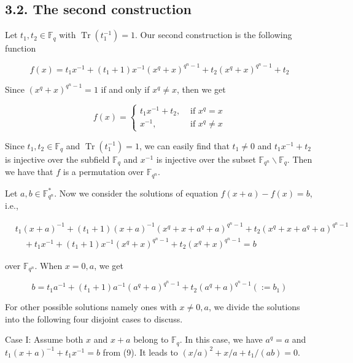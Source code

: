 \documentclass[10pt]{article}
\begin{document}
\subsection*{3.2. The second construction}
Let $t_{1}, t_{2} \in \mathbb{F}_{q}$ with $\operatorname{Tr}\left(t_{1}^{-1}\right)=1$. Our second construction is the following function


\begin{equation*}
f(x)=t_{1} x^{-1}+\left(t_{1}+1\right) x^{-1}\left(x^{q}+x\right)^{q^{n}-1}+t_{2}\left(x^{q}+x\right)^{q^{n}-1}+t_{2} \tag{8}
\end{equation*}


Since $\left(x^{q}+x\right)^{q^{n}-1}=1$ if and only if $x^{q} \neq x$, then we get

$$
f(x)= \begin{cases}t_{1} x^{-1}+t_{2}, & \text { if } x^{q}=x \\ x^{-1}, & \text { if } x^{q} \neq x\end{cases}
$$

Since $t_{1}, t_{2} \in \mathbb{F}_{q}$ and $\operatorname{Tr}\left(t_{1}^{-1}\right)=1$, we can easily find that $t_{1} \neq 0$ and $t_{1} x^{-1}+t_{2}$ is injective over the subfield $\mathbb{F}_{q}$ and $x^{-1}$ is injective over the subset $\mathbb{F}_{q^{n}} \backslash \mathbb{F}_{q}$. Then we have that $f$ is a permutation over $\mathbb{F}_{q^{n}}$.

Let $a, b \in \mathbb{F}_{q^{n}}^{*}$. Now we consider the solutions of equation $f(x+a)-f(x)=b$, i.e.,


\begin{align*}
& t_{1}(x+a)^{-1}+\left(t_{1}+1\right)(x+a)^{-1}\left(x^{q}+x+a^{q}+a\right)^{q^{n}-1}+t_{2}\left(x^{q}+x+a^{q}+a\right)^{q^{n}-1} \\
& \quad+t_{1} x^{-1}+\left(t_{1}+1\right) x^{-1}\left(x^{q}+x\right)^{q^{n}-1}+t_{2}\left(x^{q}+x\right)^{q^{n}-1}=b \tag{9}
\end{align*}


over $\mathbb{F}_{q^{n}}$. When $x=0, a$, we get

$$
b=t_{1} a^{-1}+\left(t_{1}+1\right) a^{-1}\left(a^{q}+a\right)^{q^{n}-1}+t_{2}\left(a^{q}+a\right)^{q^{n}-1}\left(:=b_{1}\right)
$$

For other possible solutions namely ones with $x \neq 0, a$, we divide the solutions into the following four disjoint cases to discuss.

Case I: Assume both $x$ and $x+a$ belong to $\mathbb{F}_{q}$. In this case, we have $a^{q}=a$ and $t_{1}(x+a)^{-1}+ t_{1} x^{-1}=b$ from (9). It leads to $(x / a)^{2}+x / a+t_{1} /(a b)=0$.
\end{document}
